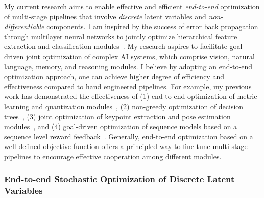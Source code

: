 \documentclass[a4paper, 10pt]{article}
\def\eg{{\em e.g.,}}
\newcommand{\figref}[1]{Figure~\ref{#1}}
\begin{document}

My current research aims to enable effective and efficient {\em
  end-to-end} optimization of multi-stage pipelines that involve {\em
  discrete} latent variables and {\em non-differentiable} components.
I am inspired by the success of error back propagation through
multilayer neural networks to jointly optimize hierarchical feature
extraction and classification modules~\cite{backprop,lecun98}.  My
research aspires to facilitate goal driven joint optimization of
complex AI systems, which comprise vision, natural language, memory,
and reasoning modules. I believe by adopting an end-to-end
optimization approach, one can achieve higher degree of efficiency and
effectiveness compared to hand engineered pipelines.  For example, my
previous work has demonstrated the effectiveness of (1) end-to-end
optimization of metric learning and quantization
modules~\cite{mlh,hdml}, (2) non-greedy optimization of decision
trees~\cite{engodt}, (3) joint optimization of keypoint extraction and
pose estimation modules~\cite{keypointnet}, and (4) goal-driven
optimization of sequence models based on a sequence level reward
feedback~\cite{mapo,ocd}. Generally, end-to-end optimization based on
a well defined objective function offers a principled way to fine-tune
multi-stage pipelines to encourage effective cooperation among
different modules.

\subsubsection*{End-to-end Stochastic Optimization of Discrete Latent Variables}
\end{document}
